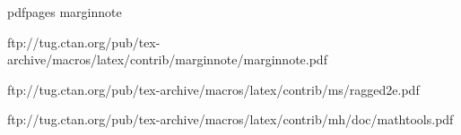 
pdfpages
marginnote

ftp://tug.ctan.org/pub/tex-archive/macros/latex/contrib/marginnote/marginnote.pdf
\usepackage{marginnote}


\usepackage{relsize}

ftp://tug.ctan.org/pub/tex-archive/macros/latex/contrib/ms/ragged2e.pdf
\usepackage{ragged2e}


\usepackage[T1]{fontenc} %
\usepackage{textcomp} %




%


ftp://tug.ctan.org/pub/tex-archive/macros/latex/contrib/mh/doc/mathtools.pdf
\usepackage[fixamsmath,disallowspaces]{mathtools}

\usepackage{fixmath}

